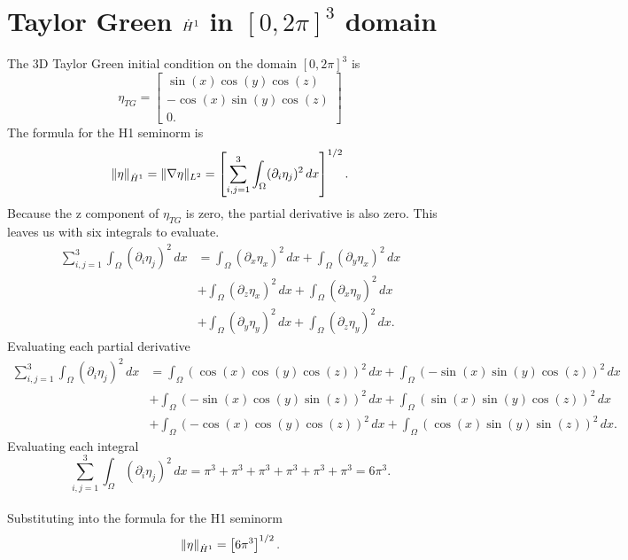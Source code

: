 \chapter{Taylor Green $\dot{H}^1$ in $[0,2\pi]^3$ domain}
\label{app:tg:seminorm:2pi}

The 3D Taylor Green initial condition on the domain $[0,2\pi]^3$ is
$$\eta_{TG} = \begin{bmatrix}
           \sin(x)\cos(y)\cos(z) \\
           -\cos(x)\sin(y)\cos(z) \\
           0.
         \end{bmatrix}$$
The formula for the H1 seminorm is
$$\|\eta\|_{\dot{H}^1} = \|\nabla\eta\|_{L^2} = \left[ \sum_{i,j=1}^3 \int_{\Omega} (\partial_i\eta_j)^2 \,dx \right]^{1/2}.$$
Because the z component of $\eta_{TG}$ is zero, the partial derivative is also zero. This leaves us with six integrals to evaluate.
\begin{align*}
\sum_{i,j=1}^3 \int_{\Omega} (\partial_i\eta_j)^2 \,dx &= \int_{\Omega} (\partial_x\eta_x)^2 \, dx + \int_{\Omega} (\partial_y\eta_x)^2 \, dx \\
&+ \int_{\Omega} (\partial_z\eta_x)^2 \, dx + \int_{\Omega} (\partial_x\eta_y)^2 \, dx \\ 
&+ \int_{\Omega} (\partial_y\eta_y)^2 \, dx + \int_{\Omega} (\partial_z\eta_y)^2 \, dx.
\end{align*}
Evaluating each partial derivative
\begin{align*}
\sum_{i,j=1}^3 \int_{\Omega} (\partial_i\eta_j)^2 \,dx &= \int_{\Omega} (\cos(x)\cos(y)\cos(z))^2 \, dx + \int_{\Omega} (-\sin(x)\sin(y)\cos(z))^2 \, dx \\
&+ \int_{\Omega} (-\sin(x)\cos(y)\sin(z))^2 \, dx + \int_{\Omega} (\sin(x)\sin(y)\cos(z))^2 \, dx \\ 
&+ \int_{\Omega} (-\cos(x)\cos(y)\cos(z))^2 \, dx + \int_{\Omega} (\cos(x)\sin(y)\sin(z))^2 \, dx.
\end{align*}
Evaluating each integral
$$\sum_{i,j=1}^3 \int_{\Omega} (\partial_i\eta_j)^2 \,dx = \pi^3 + \pi^3 + \pi^3 + \pi^3 + \pi^3 + \pi^3 = 6\pi^3. $$
\\
Substituting into the formula for the H1 seminorm
\\
$$\|\eta\|_{\dot{H}^1} = \left[ 6\pi^3 \right]^{1/2}.$$